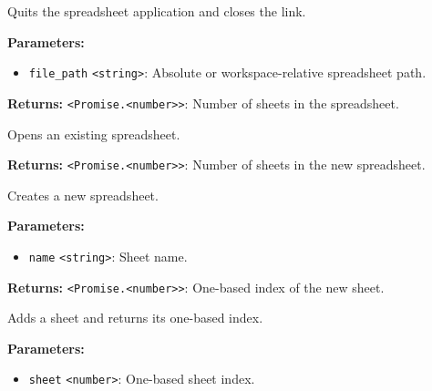 \documentclass[12pt,a4paper]{article}
\begin{document}
\noindent Quits the spreadsheet application and closes the link.

\vspace{5mm}
\noindent {}


\noindent \textbf{Parameters:}
\begin{itemize}
  \item \texttt{file\_path} \texttt{<string>}: Absolute or workspace-relative spreadsheet path.
\end{itemize}

\noindent \textbf{Returns:} \texttt{<Promise.<number>>}: Number of sheets in the spreadsheet.

\noindent Opens an existing spreadsheet.

\vspace{5mm}
\noindent {}


\noindent \textbf{Returns:} \texttt{<Promise.<number>>}: Number of sheets in the new spreadsheet.

\noindent Creates a new spreadsheet.

\vspace{5mm}
\noindent {}


\noindent \textbf{Parameters:}
\begin{itemize}
  \item \texttt{name} \texttt{<string>}: Sheet name.
\end{itemize}

\noindent \textbf{Returns:} \texttt{<Promise.<number>>}: One-based index of the new sheet.

\noindent Adds a sheet and returns its one-based index.

\vspace{5mm}
\noindent {}


\noindent \textbf{Parameters:}
\begin{itemize}
  \item \texttt{sheet} \texttt{<number>}: One-based sheet index.
\end{itemize}
\end{document}
